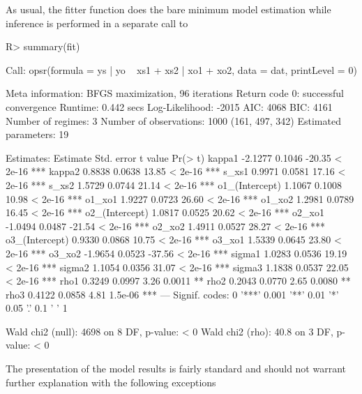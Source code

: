 \documentclass[%
    twoside, openright, titlepage, numbers=noenddot,%
    cleardoublepage=empty,%
    abstract=false,%
    BCOR=5.5mm, paper=a5, fontsize=10pt,%
]{scrreprt}
\begin{document}
As usual, the fitter function does the bare minimum model estimation while inference is performed in a separate call to
%
\begin{Schunk}
\begin{Sinput}
R> summary(fit)
\end{Sinput}
\begin{Soutput}
Call:
opsr(formula = ys | yo ~ xs1 + xs2 | xo1 + xo2, data = dat, printLevel = 0)

Meta information:
BFGS maximization, 96 iterations
Return code 0: successful convergence 
Runtime: 0.442 secs
Log-Likelihood: -2015 
AIC: 4068 
BIC: 4161 
Number of regimes: 3 
Number of observations: 1000 (161, 497, 342)
Estimated parameters: 19 

Estimates:
               Estimate Std. error t value Pr(> t)    
kappa1          -2.1277     0.1046  -20.35 < 2e-16 ***
kappa2           0.8838     0.0638   13.85 < 2e-16 ***
s_xs1            0.9971     0.0581   17.16 < 2e-16 ***
s_xs2            1.5729     0.0744   21.14 < 2e-16 ***
o1_(Intercept)   1.1067     0.1008   10.98 < 2e-16 ***
o1_xo1           1.9227     0.0723   26.60 < 2e-16 ***
o1_xo2           1.2981     0.0789   16.45 < 2e-16 ***
o2_(Intercept)   1.0817     0.0525   20.62 < 2e-16 ***
o2_xo1          -1.0494     0.0487  -21.54 < 2e-16 ***
o2_xo2           1.4911     0.0527   28.27 < 2e-16 ***
o3_(Intercept)   0.9330     0.0868   10.75 < 2e-16 ***
o3_xo1           1.5339     0.0645   23.80 < 2e-16 ***
o3_xo2          -1.9654     0.0523  -37.56 < 2e-16 ***
sigma1           1.0283     0.0536   19.19 < 2e-16 ***
sigma2           1.1054     0.0356   31.07 < 2e-16 ***
sigma3           1.1838     0.0537   22.05 < 2e-16 ***
rho1             0.3249     0.0997    3.26  0.0011 ** 
rho2             0.2043     0.0770    2.65  0.0080 ** 
rho3             0.4122     0.0858    4.81 1.5e-06 ***
---
Signif. codes:  0 '***' 0.001 '**' 0.01 '*' 0.05 '.' 0.1 ' ' 1

Wald chi2 (null): 4698 on 8 DF, p-value: < 0
Wald chi2 (rho): 40.8 on 3 DF, p-value: < 0
\end{Soutput}
\end{Schunk}
%
The presentation of the model results is fairly standard and should not warrant further explanation with the following exceptions
\end{document}
